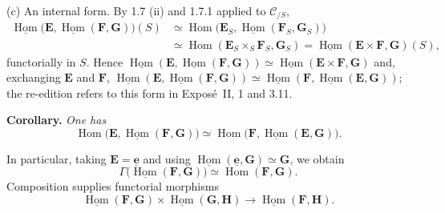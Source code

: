 (c) An internal form. By 1.7 (ii) and 1.7.1 applied to \(\mathscr C_{/S}\),
\[
  \begin{aligned}
  \underline{\operatorname{Hom}}\bigl(\mathbf E,
    \underline{\operatorname{Hom}}(\mathbf F,\mathbf G)\bigr)(S)
  &\simeq\operatorname{Hom}\bigl(\mathbf E_S,
    \underline{\operatorname{Hom}}(\mathbf F_S,\mathbf G_S)\bigr)\\
  &\simeq\operatorname{Hom}(\mathbf E_S\times_S\mathbf F_S,\mathbf G_S)
  =\underline{\operatorname{Hom}}(\mathbf E\times\mathbf F,\mathbf G)(S),
  \end{aligned}
\]
functorially in \(S\). Hence
\(\underline{\operatorname{Hom}}(\mathbf E,\underline{\operatorname{Hom}}(\mathbf F,\mathbf G))
\simeq\underline{\operatorname{Hom}}(\mathbf E\times\mathbf F,\mathbf G)\)
and, exchanging \(\mathbf E\) and \(\mathbf F\),
\(\underline{\operatorname{Hom}}(\mathbf E,\underline{\operatorname{Hom}}(\mathbf F,\mathbf G))
\simeq\underline{\operatorname{Hom}}(\mathbf F,\underline{\operatorname{Hom}}(\mathbf E,\mathbf G))\);
the re-edition refers to this form in Exposé~II, 1 and 3.11.
\par\medskip

\medskip
\noindent{}\textbf{Corollary.}
\textit{One has
\[
  \operatorname{Hom}
    \bigl(\mathbf E,
      \underline{\operatorname{Hom}}(\mathbf F,\mathbf G)\bigr)
    \simeq
  \operatorname{Hom}
    \bigl(\mathbf F,
      \underline{\operatorname{Hom}}(\mathbf E,\mathbf G)\bigr).
\]}

In particular, taking \(\mathbf E=\underline{\mathbf e}\) and using
\(\underline{\operatorname{Hom}}(\underline{\mathbf e},\mathbf G)
\simeq\mathbf G\), we obtain
\[
  \Gamma\bigl(\underline{\operatorname{Hom}}(\mathbf F,\mathbf G)\bigr)
    \simeq\operatorname{Hom}(\mathbf F,\mathbf G).
\]
Composition supplies functorial morphisms
\[
  \underline{\operatorname{Hom}}(\mathbf F,\mathbf G)
    \times
  \underline{\operatorname{Hom}}(\mathbf G,\mathbf H)
    \longrightarrow
  \underline{\operatorname{Hom}}(\mathbf F,\mathbf H).
\]


